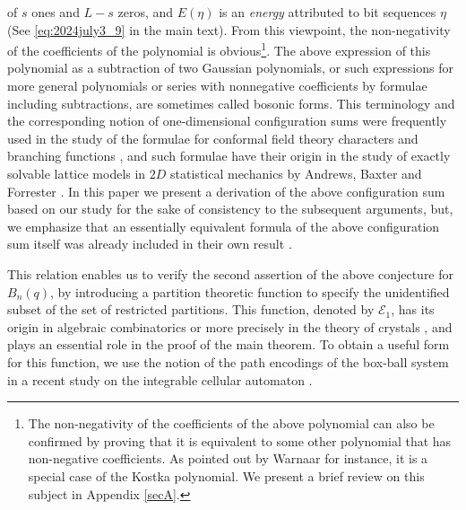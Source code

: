 \documentclass[sn-mathphys-num]{sn-jnl}%
\theoremstyle{thmstyleone}%
\theoremstyle{thmstyletwo}%
\theoremstyle{thmstylethree}%
\begin{document}
of $s$ ones and $L-s$ zeros, and $E(\eta)$ is an {\em energy} attributed to
bit sequences $\eta$ (See \eqref{eq:2024july3_9} in the main text).  
From this viewpoint, the non-negativity of the coefficients of the polynomial is obvious\footnote{{The non-negativity of the coefficients of the
above polynomial can also be confirmed 
by proving that it is equivalent to some other polynomial 
that has non-negative coefficients. 
As pointed out by Warnaar \cite{Warnaar2001, Warnaar2004} for instance, it is a special case of the Kostka polynomial. We present a brief review on this subject in Appendix \ref{secA}.}}. 
The above expression of this polynomial as a subtraction of two Gaussian polynomials,
or such expressions for more general polynomials or series with nonnegative coefficients
by formulae including subtractions, are sometimes called bosonic forms.
This terminology {and the corresponding notion of one-dimensional configuration sums
were frequently} 
used in the study of the formulae for
conformal field theory characters and branching {functions
\cite{Schilling1996, SW2002, Warnaar2001}}, and such formulae have their origin in the study of
exactly solvable lattice models in $2D$ statistical mechanics {by 
Andrews, Baxter and Forrester \cite{ABF}.
In this paper we present a derivation of the above configuration sum 
based on our study \cite{Takagi1, Takagi2025}
for the sake of consistency to the subsequent arguments,
but, we emphasize that 
an essentially equivalent formula of the above configuration sum itself was already included in 
their own result \cite[Lemma 2.6.1]{ABF}.}


This relation enables us to verify the second assertion of the above conjecture for $B_n(q)$,
by introducing a partition theoretic function
to specify the unidentified subset of the set of restricted partitions.
This function, denoted by $\mathcal{E}_1$, has its origin in algebraic combinatorics 
or more precisely in
the theory of crystals \cite{KMN},
and plays an essential role in the proof of the main theorem.
To obtain a useful form for this function, we use the notion of the path encodings
of the box-ball system
in a recent study on the integrable cellular automaton \cite{CKST2023}. 
\end{document}
